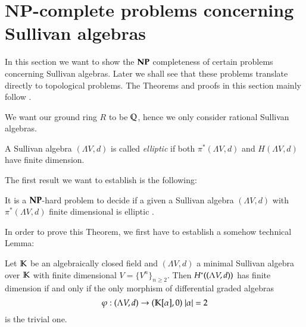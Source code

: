  \section{NP-complete problems concerning Sullivan algebras}
 
 In this section we want to show the 
 $\mathbf{NP}$ completeness of certain problems concerning Sullivan algebras. Later we shall see that these problems
 translate directly to topological problems. The Theorems and proofs in this section mainly follow  \cite{Lechuga2000}.
 
 We want our ground ring $R$ to be  $\mathbb{Q}$, hence we only consider rational Sullivan algebras.
 
 \begin{Definition}
  A Sullivan algebra $(\Lambda V, d)$ is called \emph{elliptic} if both $\pi^*(\Lambda V,d)$ and $H(\Lambda V,d)$ have
  finite dimension.
 \end{Definition}
 
 The first result we want to establish is the following:
 
 \begin{Theorem}
 \label{cohomologyFinTheorem}
  It is a $\mathbf{NP}$-hard problem to decide if a given a Sullivan algebra $(\Lambda V,d)$ with $\pi^*(\Lambda V,d)$ finite dimensional 
  is elliptic . 
 \end{Theorem}
 
 In order to prove this Theorem, we first have to establish a somehow technical Lemma:
 
 \begin{Lemma}
 \label{lma:IfAndOnlyIfNonTrivialMorphism}
  Let $\mathbb{K}$ be an algebraically closed field and $(\Lambda V,d)$ a minimal Sullivan
  algebra over $\mathbb{K}$ with finite dimensional $V = {\lbrace V^n \rbrace}_{n \geq 2}$. \newline
  Then $H^*((\Lambda V,d))$ has finite dimension if and only if   
  the only morphism of differential graded algebras 
  $$ \varphi : (\Lambda V,d) \to (\mathbb{K}[\alpha],0) \; |\alpha| = 2 $$ 
  is the trivial one.
 \end{Lemma}

